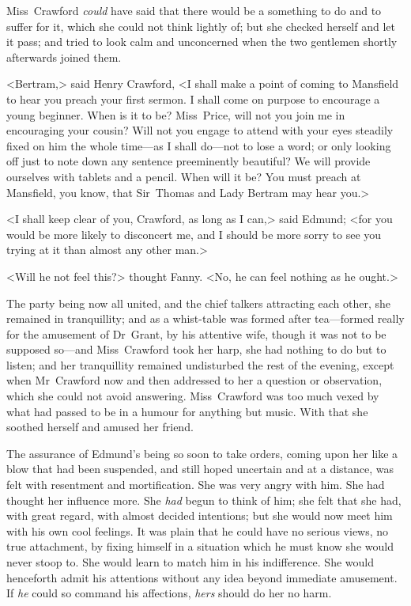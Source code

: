 Miss~Crawford \textit{could}  have said that there would be a something to do and to suffer for it, which she could not think lightly of; but she checked herself and let it pass; and tried to look calm and unconcerned when the two gentlemen shortly afterwards joined them.

<Bertram,> said Henry Crawford, <I shall make a point of coming to Mansfield to hear you preach your first sermon. I shall come on purpose to encourage a young beginner. When is it to be? Miss~Price, will not you join me in encouraging your cousin? Will not you engage to attend with your eyes steadily fixed on him the whole time—as I shall do—not to lose a word; or only looking off just to note down any sentence preeminently beautiful? We will provide ourselves with tablets and a pencil. When will it be? You must preach at Mansfield, you know, that Sir~Thomas and Lady Bertram may hear you.>

<I shall keep clear of you, Crawford, as long as I can,> said Edmund; <for you would be more likely to disconcert me, and I should be more sorry to see you trying at it than almost any other man.>

<Will he not feel this?> thought Fanny. <No, he can feel nothing as he ought.>

The party being now all united, and the chief talkers attracting each other, she remained in tranquillity; and as a whist-table was formed after tea—formed really for the amusement of Dr~Grant, by his attentive wife, though it was not to be supposed so—and Miss~Crawford took her harp, she had nothing to do but to listen; and her tranquillity remained undisturbed the rest of the evening, except when Mr~Crawford now and then addressed to her a question or observation, which she could not avoid answering. Miss~Crawford was too much vexed by what had passed to be in a humour for anything but music. With that she soothed herself and amused her friend.

The assurance of Edmund's being so soon to take orders, coming upon her like a blow that had been suspended, and still hoped uncertain and at a distance, was felt with resentment and mortification. She was very angry with him. She had thought her influence more. She \textit{had}  begun to think of him; she felt that she had, with great regard, with almost decided intentions; but she would now meet him with his own cool feelings. It was plain that he could have no serious views, no true attachment, by fixing himself in a situation which he must know she would never stoop to. She would learn to match him in his indifference. She would henceforth admit his attentions without any idea beyond immediate amusement. If \textit{he}  could so command his affections, \textit{hers}  should do her no harm. 
